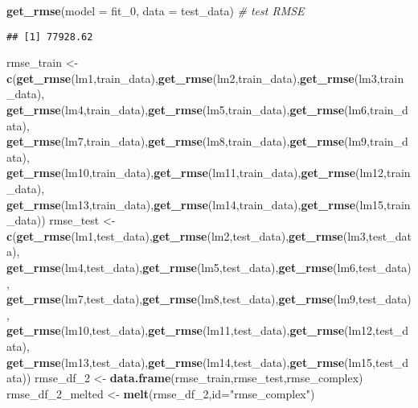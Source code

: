 \documentclass[]{article}
\newenvironment{Shaded}{\begin{snugshade}}{\end{snugshade}}
\newcommand{\CommentTok}[1]{\textcolor[rgb]{0.56,0.35,0.01}{\textit{#1}}}
\newcommand{\DataTypeTok}[1]{\textcolor[rgb]{0.13,0.29,0.53}{#1}}
\newcommand{\DecValTok}[1]{\textcolor[rgb]{0.00,0.00,0.81}{#1}}
\newcommand{\KeywordTok}[1]{\textcolor[rgb]{0.13,0.29,0.53}{\textbf{#1}}}
\newcommand{\NormalTok}[1]{#1}
\newcommand{\StringTok}[1]{\textcolor[rgb]{0.31,0.60,0.02}{#1}}
\begin{document}
\begin{Shaded}
\begin{Highlighting}[]
\KeywordTok{get_rmse}\NormalTok{(}\DataTypeTok{model =}\NormalTok{ fit_}\DecValTok{0}\NormalTok{, }\DataTypeTok{data =}\NormalTok{ test_data) }\CommentTok{# test RMSE}
\end{Highlighting}
\end{Shaded}

\begin{verbatim}
## [1] 77928.62
\end{verbatim}

\begin{Shaded}
\begin{Highlighting}[]
\NormalTok{rmse_train <-}\KeywordTok{c}\NormalTok{(}\KeywordTok{get_rmse}\NormalTok{(lm1,train_data),}\KeywordTok{get_rmse}\NormalTok{(lm2,train_data),}\KeywordTok{get_rmse}\NormalTok{(lm3,train_data),}
               \KeywordTok{get_rmse}\NormalTok{(lm4,train_data),}\KeywordTok{get_rmse}\NormalTok{(lm5,train_data),}\KeywordTok{get_rmse}\NormalTok{(lm6,train_data),}
               \KeywordTok{get_rmse}\NormalTok{(lm7,train_data),}\KeywordTok{get_rmse}\NormalTok{(lm8,train_data),}\KeywordTok{get_rmse}\NormalTok{(lm9,train_data),}
               \KeywordTok{get_rmse}\NormalTok{(lm10,train_data),}\KeywordTok{get_rmse}\NormalTok{(lm11,train_data),}\KeywordTok{get_rmse}\NormalTok{(lm12,train_data),}
               \KeywordTok{get_rmse}\NormalTok{(lm13,train_data),}\KeywordTok{get_rmse}\NormalTok{(lm14,train_data),}\KeywordTok{get_rmse}\NormalTok{(lm15,train_data))}
\NormalTok{rmse_test <-}\KeywordTok{c}\NormalTok{(}\KeywordTok{get_rmse}\NormalTok{(lm1,test_data),}\KeywordTok{get_rmse}\NormalTok{(lm2,test_data),}\KeywordTok{get_rmse}\NormalTok{(lm3,test_data),}
              \KeywordTok{get_rmse}\NormalTok{(lm4,test_data),}\KeywordTok{get_rmse}\NormalTok{(lm5,test_data),}\KeywordTok{get_rmse}\NormalTok{(lm6,test_data),}
              \KeywordTok{get_rmse}\NormalTok{(lm7,test_data),}\KeywordTok{get_rmse}\NormalTok{(lm8,test_data),}\KeywordTok{get_rmse}\NormalTok{(lm9,test_data),}
              \KeywordTok{get_rmse}\NormalTok{(lm10,test_data),}\KeywordTok{get_rmse}\NormalTok{(lm11,test_data),}\KeywordTok{get_rmse}\NormalTok{(lm12,test_data),}
              \KeywordTok{get_rmse}\NormalTok{(lm13,test_data),}\KeywordTok{get_rmse}\NormalTok{(lm14,test_data),}\KeywordTok{get_rmse}\NormalTok{(lm15,test_data))}
\NormalTok{rmse_df_}\DecValTok{2}\NormalTok{ <-}\StringTok{ }\KeywordTok{data.frame}\NormalTok{(rmse_train,rmse_test,rmse_complex)}
\NormalTok{rmse_df_}\DecValTok{2}\NormalTok{_melted <-}\StringTok{ }\KeywordTok{melt}\NormalTok{(rmse_df_}\DecValTok{2}\NormalTok{,}\DataTypeTok{id=}\StringTok{"rmse_complex"}\NormalTok{)}



\end{Highlighting}
\end{Shaded}
\end{document}
